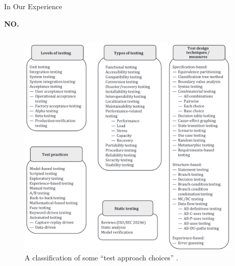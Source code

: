 \documentclass[22pt]{beamer}
\begin{document}
\begin{frame}[fragile]
\begin{textblock}{7.25}
        \begin{block}{\fontsize{37}{20}\selectfont In Our Experience}
            \vspace{5mm}
            \begin{center}
                {\fontsize{185}{20}\selectfont \textbf{NO.}}
            \end{center}
            \begin{columns}
                \begin{column}{0.7\textwidth}
                    \begin{center}
                        \begin{figure}
                            \centering
                            \includegraphics[width=\textwidth]{test approach choices.png}
                            \vspace{-5mm}
                            \caption{A classification of some ``test approach choices''
                                \cite[p.~22]{IEEE2022}.}
                            \label{Fig:approach-choices}
                        \end{figure}
                    \end{center}
                \end{column}
                \begin{column}{0.25\textwidth}

\end{column}
\end{columns}
\end{block}
\end{textblock}
\end{frame}
\end{document}
